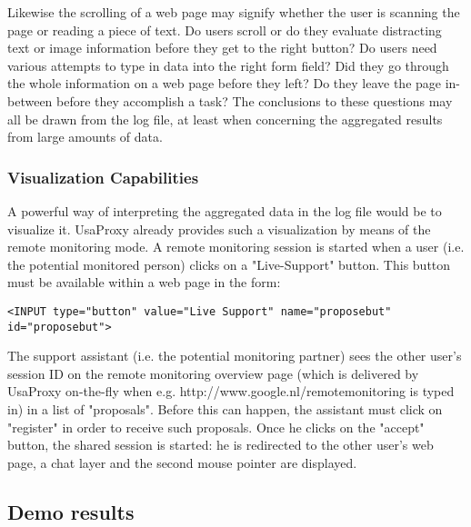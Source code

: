 Likewise the scrolling of a web page may signify whether the user is scanning the page or reading a piece of text. Do users scroll or do they evaluate distracting text or image information before they get to the right button? Do users need various attempts to type in data into the right form field?
Did they go through the whole information on a web page before they left? Do they leave the page in-between before they accomplish a task? The conclusions to these questions may all be drawn from the log file, at least when concerning the aggregated results from large amounts of data.

\subsubsection{Visualization Capabilities}
A powerful way of interpreting the aggregated data in the log file would be to visualize it. UsaProxy already provides such a visualization by means of the remote monitoring mode. A remote monitoring session is started when a user (i.e. the potential monitored person) clicks on a "Live-Support" button. This button must be available within a web page in the form:
\begin{verbatim}
<INPUT type="button" value="Live Support" name="proposebut" id="proposebut">
\end{verbatim}

The support assistant (i.e. the potential monitoring partner) sees the other user's session ID on the remote monitoring overview page (which is delivered by UsaProxy on-the-fly when e.g. http://www.google.nl/remotemonitoring is typed in) in a list of "proposals". Before this can happen, the assistant must click on "register" in order to receive such proposals. Once he clicks on the "accept" button, the shared session is started: he is redirected to the other user's web page, a chat layer and the second mouse pointer are displayed. 

\subsection{Demo results}